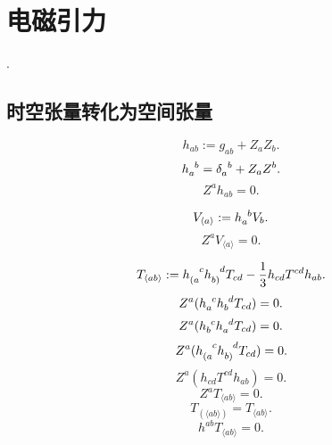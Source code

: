 \chapter{电磁引力}

\cite{Maartens2008}. 

\section{时空张量转化为空间张量}

\begin{equation}
    h_{ab}:=g_{ab}+Z_a Z_b.
\end{equation}
\begin{equation}
    h_{a}^{\ph{a}b}=\delta_{a}^{\ph{a}b}+Z_aZ^b.
\end{equation}
\begin{equation}
    Z^ah_{ab}=0.
\end{equation}

\begin{equation}
    V_{\langle a\rangle}:=h_a^{\ph{a}b}V_{b}.
\end{equation}
\begin{equation}
    Z^aV_{\langle a\rangle}=0.
\end{equation}

\begin{equation}
    T_{\langle ab\rangle}:=h_{(a}^{\ph{(a}c}h_{b)}^{\ph{b)}d}T_{cd}-\frac{1}{3}h_{cd}T^{cd}h_{ab}.
\end{equation}
\begin{equation}
    Z^a(h_{a}^{\ph{a}c}h_{b}^{\ph{b}d}T_{cd})=0.
\end{equation}
\begin{equation}
    Z^a(h_{b}^{\ph{b}c}h_{a}^{\ph{a}d}T_{cd})=0.
\end{equation}
\begin{equation}
    Z^a(h_{(a}^{\ph{(a}c}h_{b)}^{\ph{b)}d}T_{cd})=0.
\end{equation}
\begin{equation}
    Z^a(h_{cd}T^{cd}h_{ab})=0.
\end{equation}
\begin{equation}
    Z^aT_{\langle ab\rangle}=0.
\end{equation}
\begin{equation}
    T_{\left(\langle ab\rangle\right)}=T_{\langle ab\rangle}.
\end{equation}
\begin{equation}
    h^{ab}T_{\langle ab\rangle}=0.
\end{equation}

